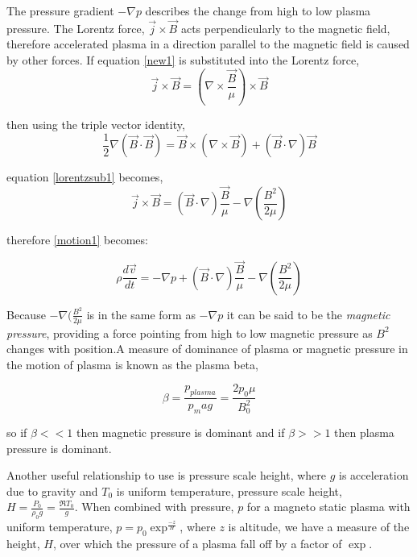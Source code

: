 The pressure gradient $-\nabla p$ describes the change from high to low plasma pressure. The Lorentz force, $\vec{j}\times\vec{B}$ acts perpendicularly to the magnetic field, therefore accelerated plasma in a direction parallel to the magnetic field is caused by other forces. If equation \ref{new1} is substituted into the Lorentz force,
\begin{equation}\label{lorentzsub1}
\vec{j}\times\vec{B} = (\nabla\times\frac{\vec{B}}{\mu})\times\vec{B}
\end{equation}

then using the triple vector identity, 
\begin{equation}
\frac{1}2{}\nabla(\vec{B}\cdot\vec{B})=\vec{B}\times(\nabla\times\vec{B})+(\vec{B}\cdot\nabla)\vec{B}
\end{equation}

equation \ref{lorentzsub1} becomes,
\begin{equation}
\vec{j}\times\vec{B} = (\vec{B}\cdot\nabla)\frac{\vec{B}}{\mu}-\nabla(\frac{B^2}{2\mu}) 
\end{equation}

therefore \ref{motion1} becomes:

\begin{equation}\label{maghydstat}
\rho\frac{d\vec{v}}{dt}= -\nabla p + (\vec{B}\cdot\nabla)\frac{\vec{B}}{\mu}-\nabla(\frac{B^2}{2\mu}) 
\end{equation}

Because $-\nabla(\frac{B^2}{2\mu}$ is in the same form as $-\nabla p$ it can be said to be the \emph{magnetic pressure}, providing a force pointing from high to low magnetic pressure as $B^2$ changes with position.A measure of dominance of plasma or magnetic pressure in the motion of plasma is known as the plasma beta, 

\begin{equation}\label{beta}
\beta=\frac{p_{plasma}}{p_mag} = \frac{2p_{0}\mu}{B_{0}^2}
\end{equation}

so if $\beta << 1$ then magnetic pressure is dominant and if $\beta >> 1$ then plasma pressure is dominant.

Another useful relationship to use is pressure scale height, where $g$ is acceleration due to gravity and $T_0$ is uniform temperature, pressure scale height, $H=\frac{P_0}{\rho_{0}g} = \frac{\Re T_{0}}{g}$. When combined with pressure, $p$ for a magneto static plasma with uniform temperature, $p=p_{0}\exp^{\frac{-z}{H}}$, where $z$ is altitude, we have a measure of the height, $H$, over which the pressure of a plasma fall off by a factor of $\exp$. 

